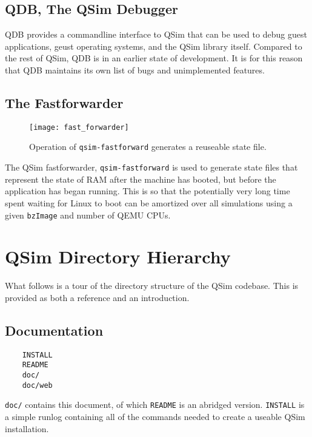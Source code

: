 \documentclass[letterpaper, 10pt]{book}
\begin{document}
\subsection{QDB, The QSim Debugger}

QDB provides a commandline interface to QSim that can be used to debug guest
applications, geust operating systems, and the QSim library itself. Compared to
the rest of QSim, QDB is in an earlier state of development. It is for this
reason that QDB maintains its own list of bugs and unimplemented features.

\subsection{The Fastforwarder}\label{sec:fastforwarder}
\begin{figure}
\begin{centering}
\texttt{[image: fast\_forwarder]}
\caption{Operation of \texttt{qsim-fastforward} generates a reuseable state
         file.}
\label{fig:fastforwarder}
\end{centering}
\end{figure}

The QSim fastforwarder, \texttt{qsim-fastforward} is used to generate state
files that represent the state of RAM after the machine has booted, but before
the application has began running. This is so that the potentially very
long time spent waiting for Linux to boot can be amortized over all simulations
using a given \texttt{bzImage} and number of QEMU CPUs.

\section{QSim Directory Hierarchy}
What follows is a tour of the directory structure of the QSim codebase. This is
provided as both a reference and an introduction.

\subsection{Documentation}

\begin{verbatim}
    INSTALL
    README
    doc/
    doc/web
\end{verbatim}
\texttt{doc/} contains this document, of which \texttt{README} is an abridged
version. \texttt{INSTALL} is a simple runlog containing all of the commands
needed to create a useable QSim installation.
\end{document}
